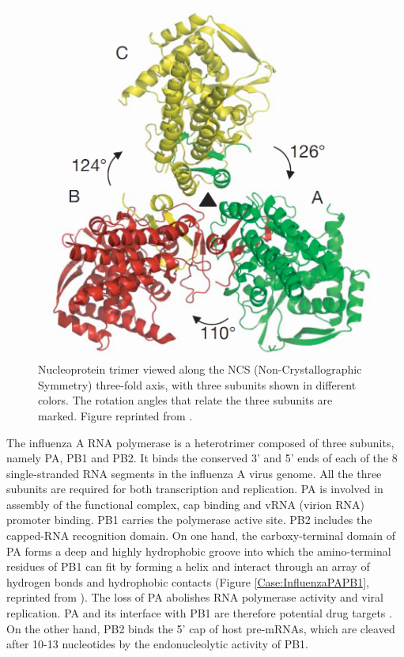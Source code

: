 \begin{figure}
\centering
\includegraphics[width=\linewidth]{Case/InfluenzaNucleoprotein.png}
\caption{Nucleoprotein trimer viewed along the NCS (Non-Crystallographic Symmetry) three-fold axis, with three subunits shown in different colors. The rotation angles that relate the three subunits are marked. Figure reprinted from \citep{1140}.}
\label{Case:InfluenzaNucleoprotein}
\end{figure}

The influenza A RNA polymerase is a heterotrimer composed of three subunits, namely PA, PB1 and PB2. It binds the conserved 3' and 5' ends of each of the 8 single-stranded RNA segments in the influenza A virus genome. All the three subunits are required for both transcription and replication. PA is involved in assembly of the functional complex, cap binding and vRNA (virion RNA) promoter binding. PB1 carries the polymerase active site. PB2 includes the capped-RNA recognition domain. On one hand, the carboxy-terminal domain of PA forms a deep and highly hydrophobic groove into which the amino-terminal residues of PB1 can fit by forming a helix and interact through an array of hydrogen bonds and hydrophobic contacts \citep{1141} (Figure \ref{Case:InfluenzaPAPB1}, reprinted from \citep{1141}). The loss of PA abolishes RNA polymerase activity and viral replication. PA and its interface with PB1 are therefore potential drug targets \citep{1141}. On the other hand, PB2 binds the 5' cap of host pre-mRNAs, which are cleaved after 10-13 nucleotides by the endonucleolytic activity of PB1.

